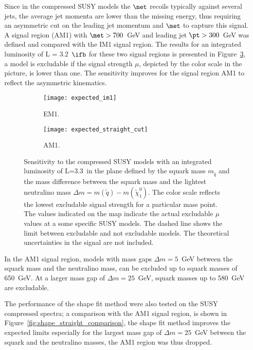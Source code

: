 Since in the compressed SUSY models the $\met$ recoils typically against several
jets, the average jet momenta are lower than the missing energy, thus requiring
an asymmetric cut on the leading jet momentum and $\met$ to capture this
signal. A signal region (AM1) with $\met > 700$~GeV and leading jet
$\pt > 300$~GeV was defined and compared with the IM1 signal region. The results
for an integrated luminosity of L = 3.2~$\ifb$ for these two signal regions is
presented in Figure~\ref{fig:im1_straight_comparison}, a model is excludable if
the signal strength $\mu$, depicted by the color scale in the picture, is lower
than one. The sensitivity improves for the signal region AM1 to reflect the
asymmetric kinematics.

\begin{figure}[!h]
  \centering
  \begin{subfigure}[t]{.48\linewidth}
    \texttt{[image: expected\_im1]}
    \caption{EM1.}
    \label{fig:expected_im1}
  \end{subfigure}
  \begin{subfigure}[t]{.48\linewidth}
    \texttt{[image: expected\_straight\_cut]}
    \caption{AM1.}
    \label{fig:expected_straight}
  \end{subfigure}
  \caption{Sensitivity to the compressed SUSY models with an integrated
    luminosity of L=3.3\ifb ~in the plane defined by the squark mass
    $m_{\tilde{q}}$ and the mass difference between the squark mass and the
    lightest neutralino mass
    $\Delta m = m(\tilde{q}) - m(\tilde{\chi}_{1}^{0})$. The color scale
    reflects the lowest excludable signal strength for a particular mass
    point. The values indicated on the map indicate the actual excludable $\mu$
    values at a some specific SUSY models. The dashed line shows the limit
    between excludable and not excludable models. The theoretical uncertainties
    in the signal are not included.}
  \label{fig:im1_straight_comparison}
\end{figure}

In the AM1 signal region, models with mass gaps $\Delta m = 5$~GeV between the
squark mass and the neutralino mass, can be excluded up to squark masses of
650~GeV. At a larger mass gap of $\Delta m = 25$~GeV, squark masses up to
580~GeV are excludable.

The performance of the shape fit method were also tested on the SUSY compressed
spectra; a comparison with the AM1 signal region, is shown in
Figure~\ref{fig:shape_straight_comparison}, the shape fit method improves the
expected limits especially for the largest mass gap of $\Delta m = 25$~GeV
between the squark and the neutralino masses, the AM1 region was thus dropped.

